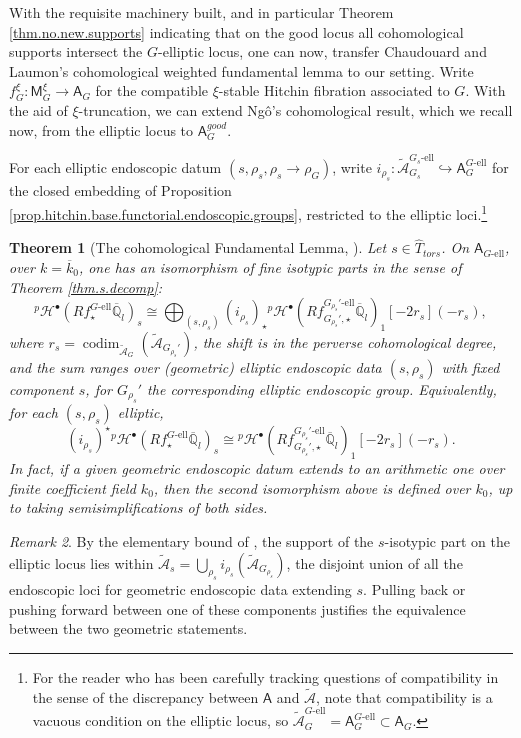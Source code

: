 \documentclass[openany]{amsbook}
\newtheorem{theorem}{Theorem}[chapter]
\theoremstyle{definition}
\theoremstyle{remark}
\newtheorem{remark}[theorem]{Remark}
\numberwithin{equation}{section}
\newcommand{\Q}{\mathbb{Q}}
\newcommand{\cA}{\mathcal{A}}
\newcommand{\ol}[1]{\overline{#1}}
\renewcommand{\-}{\operatorname{-}}
\newcommand{\on}[1]{\operatorname{#1}}
\newcommand{\pH}{{}^p \mathcal{H}}
\newcommand{\good}{\mathit{good}}
\newcommand{\el}{\text{-ell}}
\newcommand{\ctA}{\widetilde{\cA}}
\newcommand{\bM}{\mathsf{M}}
\newcommand{\bA}{\mathsf{A}}
\newcommand{\bAe}[1]{\bA_{#1\el}}
\newcommand{\tors}{\mathit{tors}}
\newcommand{\codim}{\on{codim}}
\begin{document}
With the requisite machinery built, and in particular Theorem \ref{thm.no.new.supports} indicating that on the good locus all cohomological supports intersect the $G$-elliptic locus, one can now, transfer Chaudouard and Laumon's cohomological weighted fundamental lemma to our setting. Write $f_G^{\xi} : \bM_G^{\xi} \to \bA_{G}$ for the compatible $\xi$-stable Hitchin fibration associated to $G$. With the aid of $\xi$-truncation, we can extend Ng\^{o}'s cohomological result, which we recall now, from the elliptic locus to $\bA_G^{\good}$. 

For each elliptic endoscopic datum $(s, \rho_s, \rho_s \to \rho_G)$, write $i_{\rho_s} : \ctA_{G_s}^{G_s\el} \hookrightarrow \bA_G^{G\el}$ for the closed embedding of Proposition \ref{prop.hitchin.base.functorial.endoscopic.groups}, restricted to the elliptic loci.\footnote{For the reader who has been carefully tracking questions of compatibility in the sense of the discrepancy between $\bA$ and $\ctA$, note that compatibility is a vacuous condition on the elliptic locus, so $\ctA_{G}^{G\el} = \bA_G^{G\el} \subset \bA_G$.}


\begin{theorem}[{{The cohomological Fundamental Lemma, \cite[6.4.1, 6.4.2]{ngofl}}}]\label{thm.ngo.coh.fl}
    Let $s \in \widehat{T}_{\tors}$. On $\bAe{G}$, over $k = \ol{k}_0$, one has an isomorphism of fine isotypic parts in the sense of Theorem \ref{thm.s.decomp}:
    $$
        \pH^\bullet(R f^{G\el}_{\star} \ol{\Q}_l)_{s} \cong \bigoplus_{(s, \rho_s)} (i_{\rho_s})_\star \pH^\bullet(R f^{G_{\rho_s}'\el}_{G_{\rho_s}',\star} \ol{\Q}_l)_1[-2r_s](-r_s),
    $$
    where $r_s = \codim_{\ctA_G}(\ctA_{G_{\rho_s}'})$, the shift is in the perverse cohomological degree, and the sum ranges over (geometric) elliptic endoscopic data $(s, \rho_s)$ with fixed component $s$, for $G_{\rho_s}'$ the corresponding elliptic endoscopic group. Equivalently, for each $(s, \rho_s)$ elliptic,
    $$
        (i_{\rho_s})^\star \pH^\bullet(R f^{G\el}_{\star} \ol{\Q}_l)_{s} \cong \pH^{\bullet}(R f^{G_{\rho_s}'\el}_{G_{\rho_s}',\star} \ol{\Q}_l)_1[-2r_s](-r_s).
    $$
    In fact, if a given geometric endoscopic datum extends to an arithmetic one over finite coefficient field $k_0$, then the second isomorphism above is defined over $k_0$, up to taking semisimplifications of both sides.
\end{theorem}

\begin{remark}
By the elementary bound of \cite[Proposition 6.2.3]{ngofl}, the support of the $s$-isotypic part on the elliptic locus lies within $\ctA_{s} = \bigcup_{\rho_{s}} i_{\rho_s}(\ctA_{G_{\rho_s}})$, the disjoint union of all the endoscopic loci for geometric endoscopic data extending $s$. Pulling back or pushing forward between one of these components justifies the equivalence between the two geometric statements. 
\end{remark}
\end{document}
